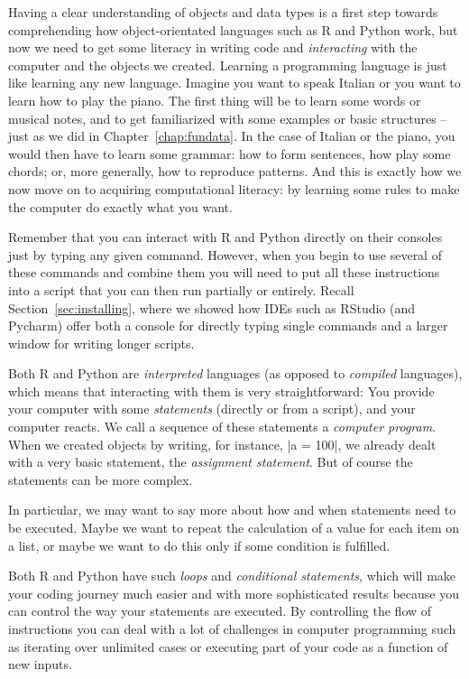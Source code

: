 Having a clear understanding of objects and data types is a first step
towards comprehending how object-orientated languages such as R and Python work,
but now we need to get some literacy in writing code and \emph{interacting}
with the computer and the objects we created. Learning a programming
language is just like learning any new language.  Imagine you want to
speak Italian or you want to learn how to play the piano. The first thing
will be to learn some words or musical notes, and to get familiarized
with some examples or basic structures -- just as we did in Chapter~\ref{chap:fundata}. In the
case of Italian or the piano, you would then have to learn  some grammar:
how to form sentences, how play some chords; or, more generally,
how to reproduce patterns. And this is exactly how we 
now move on to acquiring computational literacy: by learning some
rules to make the computer do exactly what you want.

Remember that you can interact with R and Python directly on their
consoles just by typing any given command. However, when
you begin to use several of these commands and combine them
you will need to put all these instructions into a
script that you can then run partially or entirely. Recall Section~\ref{sec:installing},
where we showed how IDEs such as RStudio (and Pycharm) offer both a
console for directly typing single commands and a larger window
for writing longer scripts.

Both R and Python are \emph{interpreted} languages (as opposed to
\emph{compiled} languages), which means that interacting with
them is very straightforward: You provide your computer with some
\emph{statements} (directly or from a script), and your computer
reacts. We call a sequence of these statements a \emph{computer program}.
When we created objects by writing, for instance,
|a = 100|,  we already dealt with a very basic statement, the \emph{assignment statement}. But of course the statements can be more complex.

In particular, we may want to say more about how and when
statements need to be executed. Maybe we want to repeat
the calculation of a value for each item on a list, or maybe
we want to do this only if some condition is fulfilled.

Both R and Python have such \emph{loops} and \emph{conditional statements}, which will
make your coding journey much easier and with more sophisticated
results because you can control the way your statements are
executed. By controlling the flow of instructions you can deal with a
lot of challenges in computer programming such as iterating over
unlimited cases or executing part of your code as a function of new
inputs.

